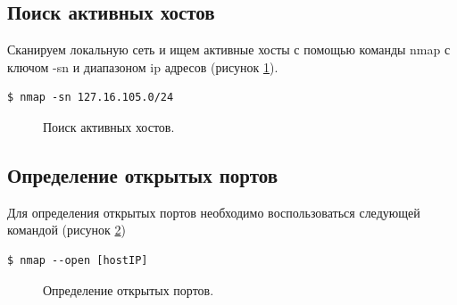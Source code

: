 \documentclass[10pt,a4paper]{report}
\begin{document}
\subsection{Поиск активных хостов}

Сканируем локальную сеть и ищем активные хосты с помощью команды nmap с ключом -sn и диапазоном ip адресов (рисунок \ref{Img:1}).
\begin{verbatim}
$ nmap -sn 127.16.105.0/24
\end{verbatim}

\begin{figure}[h!]	
	\caption{Поиск активных хостов.}
	\label{Img:1}
\end{figure}
\pagebreak

\subsection{Определение открытых портов}

Для определения открытых портов необходимо воспользоваться следующей командой (рисунок \ref{Img:2})
\begin{verbatim}
$ nmap --open [hostIP]
\end{verbatim}

\begin{figure}[h!]	
	\caption{Определение открытых портов.}
	\label{Img:2}
\end{figure}
\end{document}
